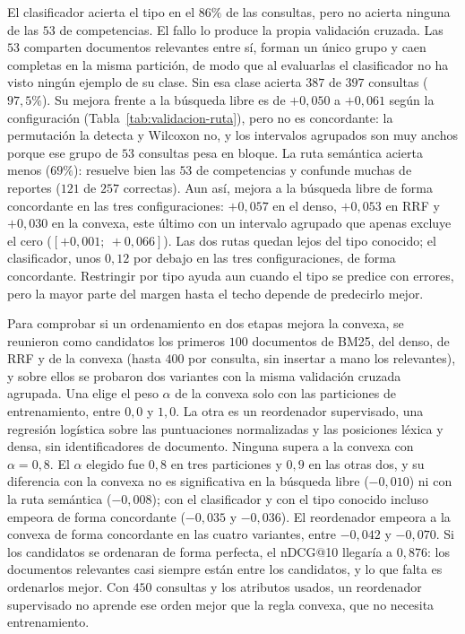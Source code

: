 \documentclass[11pt,letterpaper]{article}
\numberwithin{equation}{section}
\begin{document}
El clasificador acierta el tipo en el $86\%$ de las consultas, pero no acierta ninguna de las $53$ de competencias. El fallo lo produce la propia validación cruzada. Las $53$ comparten documentos relevantes entre sí, forman un único grupo y caen completas en la misma partición, de modo que al evaluarlas el clasificador no ha visto ningún ejemplo de su clase. Sin esa clase acierta $387$ de $397$ consultas ($97{,}5\%$). Su mejora frente a la búsqueda libre es de $+0{,}050$ a $+0{,}061$ según la configuración (Tabla~\ref{tab:validacion-ruta}), pero no es concordante: la permutación la detecta y Wilcoxon no, y los intervalos agrupados son muy anchos porque ese grupo de $53$ consultas pesa en bloque. La ruta semántica acierta menos ($69\%$): resuelve bien las $53$ de competencias y confunde muchas de reportes ($121$ de $257$ correctas). Aun así, mejora a la búsqueda libre de forma concordante en las tres configuraciones: $+0{,}057$ en el denso, $+0{,}053$ en RRF y $+0{,}030$ en la convexa, este último con un intervalo agrupado que apenas excluye el cero ($[+0{,}001;\ +0{,}066]$). Las dos rutas quedan lejos del tipo conocido; el clasificador, unos $0{,}12$ por debajo en las tres configuraciones, de forma concordante. Restringir por tipo ayuda aun cuando el tipo se predice con errores, pero la mayor parte del margen hasta el techo depende de predecirlo mejor.

Para comprobar si un ordenamiento en dos etapas mejora la convexa, se reunieron como candidatos los primeros $100$ documentos de BM25, del denso, de RRF y de la convexa (hasta $400$ por consulta, sin insertar a mano los relevantes), y sobre ellos se probaron dos variantes con la misma validación cruzada agrupada. Una elige el peso $\alpha$ de la convexa solo con las particiones de entrenamiento, entre $0{,}0$ y $1{,}0$. La otra es un reordenador supervisado, una regresión logística sobre las puntuaciones normalizadas y las posiciones léxica y densa, sin identificadores de documento. Ninguna supera a la convexa con $\alpha=0{,}8$. El $\alpha$ elegido fue $0{,}8$ en tres particiones y $0{,}9$ en las otras dos, y su diferencia con la convexa no es significativa en la búsqueda libre ($-0{,}010$) ni con la ruta semántica ($-0{,}008$); con el clasificador y con el tipo conocido incluso empeora de forma concordante ($-0{,}035$ y $-0{,}036$). El reordenador empeora a la convexa de forma concordante en las cuatro variantes, entre $-0{,}042$ y $-0{,}070$. Si los candidatos se ordenaran de forma perfecta, el nDCG@10 llegaría a $0{,}876$: los documentos relevantes casi siempre están entre los candidatos, y lo que falta es ordenarlos mejor. Con $450$ consultas y los atributos usados, un reordenador supervisado no aprende ese orden mejor que la regla convexa, que no necesita entrenamiento.
\end{document}
